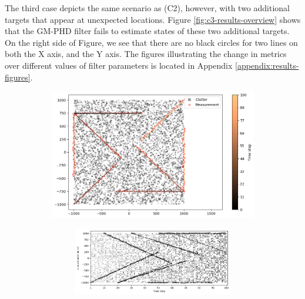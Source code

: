 
The third case depicts the same scenario as (C2), however, with two additional targets that appear at unexpected locations. Figure \ref{fig:c3-results-overview} shows that the GM-PHD filter fails to estimate states of these two additional targets. On the right side of Figure, we see that there are no black circles for two lines on both the X axis, and the Y axis. The figures illustrating the change in metrics over different values of filter parameters is located in Appendix \ref{appendix:results-figures}.

\begin{figure}
    \centering
    \begin{subfigure}[]{0.48\linewidth}
        \centering
        \includegraphics[width=\linewidth]{figures/c3-tracks-measurements.png}
    \end{subfigure}
    \hfill
    \begin{subfigure}[]{0.48\linewidth}
        \centering
        \begin{subfigure}[t]{\linewidth}
            \includegraphics[width=\linewidth]{figures/c3-x-estimates.png}
        \end{subfigure}

\end{subfigure}
\end{figure}
